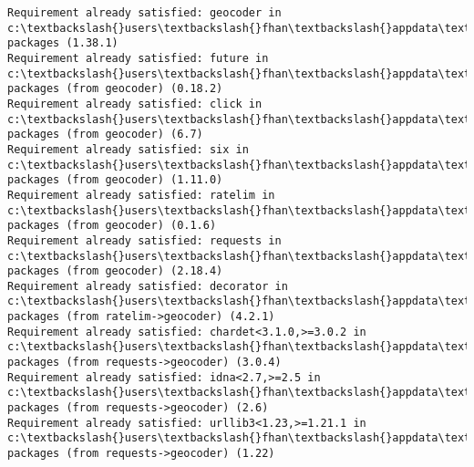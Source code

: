 \documentclass[11pt]{article}
\begin{document}
    \begin{Verbatim}[commandchars=\\\{\}]
Requirement already satisfied: geocoder in c:\textbackslash{}users\textbackslash{}fhan\textbackslash{}appdata\textbackslash{}local\textbackslash{}continuum\textbackslash{}anaconda3\textbackslash{}lib\textbackslash{}site-packages (1.38.1)
Requirement already satisfied: future in c:\textbackslash{}users\textbackslash{}fhan\textbackslash{}appdata\textbackslash{}local\textbackslash{}continuum\textbackslash{}anaconda3\textbackslash{}lib\textbackslash{}site-packages (from geocoder) (0.18.2)
Requirement already satisfied: click in c:\textbackslash{}users\textbackslash{}fhan\textbackslash{}appdata\textbackslash{}local\textbackslash{}continuum\textbackslash{}anaconda3\textbackslash{}lib\textbackslash{}site-packages (from geocoder) (6.7)
Requirement already satisfied: six in c:\textbackslash{}users\textbackslash{}fhan\textbackslash{}appdata\textbackslash{}local\textbackslash{}continuum\textbackslash{}anaconda3\textbackslash{}lib\textbackslash{}site-packages (from geocoder) (1.11.0)
Requirement already satisfied: ratelim in c:\textbackslash{}users\textbackslash{}fhan\textbackslash{}appdata\textbackslash{}local\textbackslash{}continuum\textbackslash{}anaconda3\textbackslash{}lib\textbackslash{}site-packages (from geocoder) (0.1.6)
Requirement already satisfied: requests in c:\textbackslash{}users\textbackslash{}fhan\textbackslash{}appdata\textbackslash{}local\textbackslash{}continuum\textbackslash{}anaconda3\textbackslash{}lib\textbackslash{}site-packages (from geocoder) (2.18.4)
Requirement already satisfied: decorator in c:\textbackslash{}users\textbackslash{}fhan\textbackslash{}appdata\textbackslash{}local\textbackslash{}continuum\textbackslash{}anaconda3\textbackslash{}lib\textbackslash{}site-packages (from ratelim->geocoder) (4.2.1)
Requirement already satisfied: chardet<3.1.0,>=3.0.2 in c:\textbackslash{}users\textbackslash{}fhan\textbackslash{}appdata\textbackslash{}local\textbackslash{}continuum\textbackslash{}anaconda3\textbackslash{}lib\textbackslash{}site-packages (from requests->geocoder) (3.0.4)
Requirement already satisfied: idna<2.7,>=2.5 in c:\textbackslash{}users\textbackslash{}fhan\textbackslash{}appdata\textbackslash{}local\textbackslash{}continuum\textbackslash{}anaconda3\textbackslash{}lib\textbackslash{}site-packages (from requests->geocoder) (2.6)
Requirement already satisfied: urllib3<1.23,>=1.21.1 in c:\textbackslash{}users\textbackslash{}fhan\textbackslash{}appdata\textbackslash{}local\textbackslash{}continuum\textbackslash{}anaconda3\textbackslash{}lib\textbackslash{}site-packages (from requests->geocoder) (1.22)

\end{Verbatim}
\end{document}
